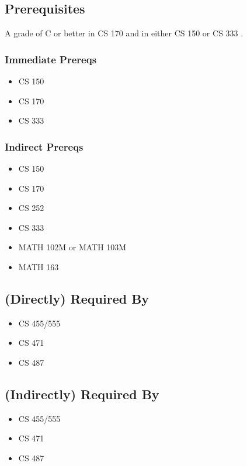 \documentclass[]{article}
\providecommand{\tightlist}{%
  \setlength{\itemsep}{0pt}\setlength{\parskip}{0pt}}
\begin{document}
\subsection{Prerequisites}\label{prerequisites-10}

A grade of C or better in CS 170 and in either CS 150 or CS 333 .

\subsubsection{Immediate Prereqs}\label{immediate-prereqs-6}

\begin{itemize}
\tightlist
\item
  CS 150
\item
  CS 170
\item
  CS 333
\end{itemize}

\subsubsection{Indirect Prereqs}\label{indirect-prereqs-6}

\begin{itemize}
\tightlist
\item
  CS 150
\item
  CS 170
\item
  CS 252
\item
  CS 333
\item
  MATH 102M or MATH 103M
\item
  MATH 163
\end{itemize}

\subsection{(Directly) Required By}\label{directly-required-by-4}

\begin{itemize}
\tightlist
\item
  CS 455/555
\item
  CS 471
\item
  CS 487
\end{itemize}

\subsection{(Indirectly) Required By}\label{indirectly-required-by-4}

\begin{itemize}
\tightlist
\item
  CS 455/555
\item
  CS 471
\item
  CS 487
\end{itemize}
\end{document}
